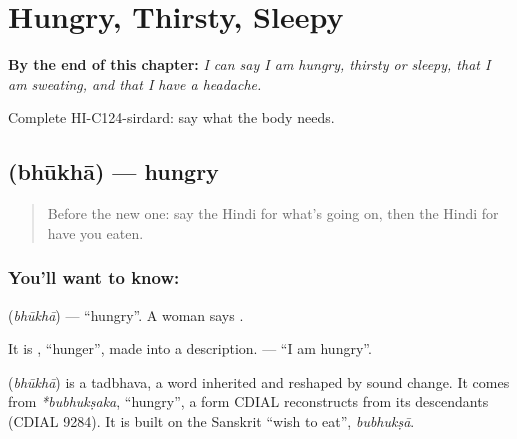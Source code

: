 
\chapter{Hungry, Thirsty, Sleepy}
\label{ch:hi-hungry-thirsty-sleepy}

\begin{chapteropening}
\textbf{By the end of this chapter:} \emph{I can say I am hungry, thirsty or sleepy, that I am sweating, and that I have a headache.}

Complete HI-C124-sirdard: say what the body needs.
\end{chapteropening}

\section[\texorpdfstring{\hi{भूखा} (bhūkhā)}{भूखा (bhūkhā)}]{ (bhūkhā) — hungry}

\label{lesson:HI-C124-bhukha}



\begin{quote}
Before the new one: say the Hindi for what's going on, then the Hindi for have you eaten.
\end{quote}

\subsection*{You'll want to know: }
\textbf{} (\emph{bhūkhā}) — \textquotedblleft{}hungry\textquotedblright{}. A woman says \textbf{}.

It is \textbf{}, \textquotedblleft{}hunger\textquotedblright{}, made into a description. \textbf{  } — \textquotedblleft{}I am hungry\textquotedblright{}.

\begin{cousinweb}
\textbf{} (\emph{bhūkhā}) is a tadbhava, a word inherited and reshaped by sound change. It comes from \emph{*bubhukṣaka}, \textquotedblleft{}hungry\textquotedblright{}, a form CDIAL reconstructs from its descendants (CDIAL 9284). It is built on the Sanskrit \textquotedblleft{}wish to eat\textquotedblright{}, \emph{bubhukṣā}.
\end{cousinweb}

